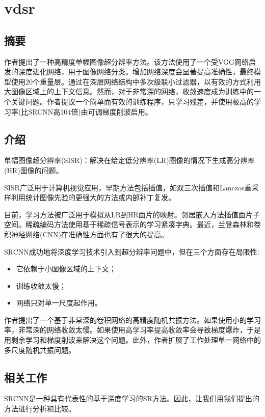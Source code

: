 \documentclass[UTF8,a4paper,10pt]{ctexrep}
\begin{document}
\chapter{vdsr}
\section{摘要}

作者提出了一种高精度单幅图像超分辨率方法。该方法使用了一个受VGG网络启发的深度进化网络，用于图像网络分类。增加网络深度会显著提高准确性，最终模型使用20个重量层。通过在深层网络结构中多次级联小过滤器，以有效的方式利用大图像区域上的上下文信息。然而，对于非常深的网络，收敛速度成为训练中的一个关键问题。作者提议一个简单而有效的训练程序，只学习残差，并使用极高的学习率(比SRCNN高104倍)由可调梯度削波启用。

\section{介绍}

单幅图像超分辨率(SISR)：解决在给定低分辨率(LR)图像的情况下生成高分辨率(HR)图像的问题。

SISR广泛用于计算机视觉应用，早期方法包括插值，如双三次插值和Lanczos重采样利用统计图像先验的更强大的方法或内部补丁复发。

目前，学习方法被广泛用于模拟从LR到HR面片的映射。邻居嵌入方法插值面片子空间。稀疏编码方法使用基于稀疏信号表示的学习紧凑字典。最近，兰登森林和卷积神经网络(CNN)在准确性方面也有了很大的提高。

SRCNN成功地将深度学习技术引入到超分辨率问题中，但在三个方面存在局限性:
\begin{itemize}
  \item 它依赖于小图像区域的上下文；
  \item 训练收敛太慢；
  \item 网络只对单一尺度起作用。
\end{itemize}

作者提出了一个基于非常深的卷积网络的高精度随机共振方法。如果使用小的学习率，非常深的网络收敛太慢。如果使用高学习率提高收敛率会导致梯度爆炸，于是用剩余学习和梯度削波来解决这个问题。此外，作者扩展了工作处理单一网络中的多尺度随机共振问题。

\section{相关工作}

SRCNN是一种具有代表性的基于深度学习的SR方法。因此，让我们用我们提出的方法进行分析和比较。
\end{document}
